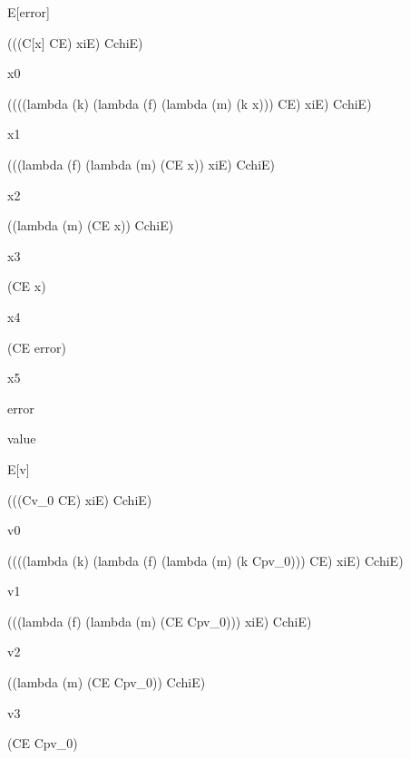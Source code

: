 \documentclass[ms,electronic,twosidetoc,letterpaper,chaptercenter,parttop]{byumsphd}
\begin{document}
\begin{singlespace}
\begin{schemedisplay}
E[error]
\end{schemedisplay}

\begin{schemedisplay}
(((C[x] CE) xiE) CchiE)
\end{schemedisplay}

x0
\begin{schemedisplay}
((((lambda (k) (lambda (f) (lambda (m) (k x))) CE) xiE) CchiE)
\end{schemedisplay}

x1
\begin{schemedisplay}
(((lambda (f) (lambda (m) (CE x)) xiE) CchiE)
\end{schemedisplay}

x2
\begin{schemedisplay}
((lambda (m) (CE x)) CchiE)
\end{schemedisplay}

x3
\begin{schemedisplay}
(CE x)
\end{schemedisplay}

x4
\begin{schemedisplay}
(CE error)
\end{schemedisplay}

x5
\begin{schemedisplay}
error
\end{schemedisplay}

value
\begin{schemedisplay}
E[v]
\end{schemedisplay}

\begin{schemedisplay}
(((Cv_0 CE) xiE) CchiE)
\end{schemedisplay}

v0
\begin{schemedisplay}
((((lambda (k) (lambda (f) (lambda (m) (k Cpv_0))) CE) xiE) CchiE)
\end{schemedisplay}

v1
\begin{schemedisplay}
(((lambda (f) (lambda (m) (CE Cpv_0))) xiE) CchiE)
\end{schemedisplay}

v2
\begin{schemedisplay}
((lambda (m) (CE Cpv_0)) CchiE)
\end{schemedisplay}

v3
\begin{schemedisplay}
(CE Cpv_0)
\end{schemedisplay}
\end{singlespace}
\end{document}
